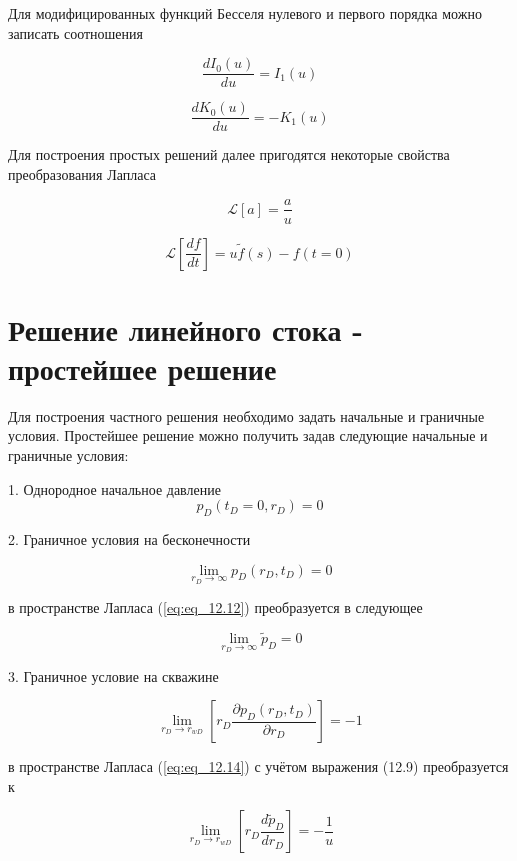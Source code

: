 Для модифицированных функций Бесселя нулевого и первого порядка можно записать соотношения

$$\dfrac{dI_0(u)}{du} = I_1(u)$$

$$\dfrac{dK_0(u)}{du} =-K_1(u)$$

Для построения простых решений далее пригодятся некоторые свойства преобразования Лапласа

$$ \mathcal{L} \left [ a \right] = \dfrac{a}{u}$$


$$ \mathcal{L} \left [ \dfrac{df}{dt} \right] = u \tilde{f}(s) - f(t=0)$$


\section{Решение линейного стока - простейшее решение}

Для построения частного решения необходимо задать начальные и граничные условия. Простейшее решение можно получить задав следующие начальные и граничные условия:

1. Однородное начальное давление
\begin{equation}  \label{eq:eq_12.11}
	 p_D(t_D=0, r_D) = 0   
\end{equation}

2. Граничное условия на бесконечности 

\begin{equation}  \label{eq:eq_12.12}
	\lim_{r_D \to \infty} p_D(r_D, t_D) = 0  
\end{equation}

в пространстве Лапласа  (\ref{eq:eq_12.12}) преобразуется в следующее

\begin{equation}  \label{eq:eq_12.13}
	\lim_{r_D \to \infty} \tilde{p}_D = 0 
\end{equation}

3. Граничное условие на скважине

\begin{equation}  \label{eq:eq_12.14}
	\lim_{r_D \to r_{wD}} \left[ r_D \dfrac{ \partial p_D(r_D, t_D)}{\partial r_D} \right] = -1   
\end{equation}

в пространстве Лапласа  (\ref{eq:eq_12.14}) с учётом выражения (12.9) преобразуется к

\begin{equation}  \label{eq:eq_12.15}
	\lim_{r_D \to r_{wD}} \left[ r_D \dfrac{ d \tilde{p}_D}{d r_D} \right] = -\dfrac{1}{u} 
\end{equation} 


